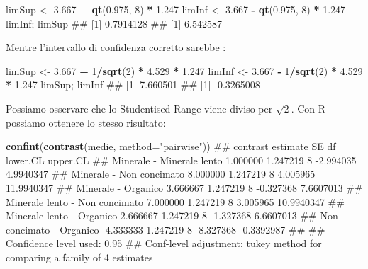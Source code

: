 \documentclass[a4paper,12pt,oneside]{book}
\newenvironment{Shaded}{\begin{snugshade}}{\end{snugshade}}
\newcommand{\KeywordTok}[1]{\textcolor[rgb]{0.13,0.29,0.53}{\textbf{#1}}}
\newcommand{\DataTypeTok}[1]{\textcolor[rgb]{0.13,0.29,0.53}{#1}}
\newcommand{\DecValTok}[1]{\textcolor[rgb]{0.00,0.00,0.81}{#1}}
\newcommand{\FloatTok}[1]{\textcolor[rgb]{0.00,0.00,0.81}{#1}}
\newcommand{\StringTok}[1]{\textcolor[rgb]{0.31,0.60,0.02}{#1}}
\newcommand{\OperatorTok}[1]{\textcolor[rgb]{0.81,0.36,0.00}{\textbf{#1}}}
\newcommand{\NormalTok}[1]{#1}
\theoremstyle{definition}
\theoremstyle{definition}
\theoremstyle{definition}
\theoremstyle{remark}
\begin{document}
\begin{Shaded}
\begin{Highlighting}[]
\NormalTok{limSup <-}\StringTok{ }\FloatTok{3.667} \OperatorTok{+}\StringTok{ }\KeywordTok{qt}\NormalTok{(}\FloatTok{0.975}\NormalTok{, }\DecValTok{8}\NormalTok{) }\OperatorTok{*}\StringTok{ }\FloatTok{1.247}
\NormalTok{limInf <-}\StringTok{ }\FloatTok{3.667} \OperatorTok{-}\StringTok{ }\KeywordTok{qt}\NormalTok{(}\FloatTok{0.975}\NormalTok{, }\DecValTok{8}\NormalTok{) }\OperatorTok{*}\StringTok{ }\FloatTok{1.247}
\NormalTok{limInf; limSup}
\NormalTok{## [1] 0.7914128}
\NormalTok{## [1] 6.542587}
\end{Highlighting}
\end{Shaded}

Mentre l'intervallo di confidenza corretto sarebbe :

\begin{Shaded}
\begin{Highlighting}[]
\NormalTok{limSup <-}\StringTok{ }\FloatTok{3.667} \OperatorTok{+}\StringTok{ }\DecValTok{1}\OperatorTok{/}\KeywordTok{sqrt}\NormalTok{(}\DecValTok{2}\NormalTok{) }\OperatorTok{*}\StringTok{ }\FloatTok{4.529} \OperatorTok{*}\StringTok{ }\FloatTok{1.247}
\NormalTok{limInf <-}\StringTok{ }\FloatTok{3.667} \OperatorTok{-}\StringTok{ }\DecValTok{1}\OperatorTok{/}\KeywordTok{sqrt}\NormalTok{(}\DecValTok{2}\NormalTok{) }\OperatorTok{*}\StringTok{ }\FloatTok{4.529} \OperatorTok{*}\StringTok{ }\FloatTok{1.247}
\NormalTok{limSup; limInf}
\NormalTok{## [1] 7.660501}
\NormalTok{## [1] -0.3265008}
\end{Highlighting}
\end{Shaded}

Possiamo osservare che lo Studentised Range viene diviso per
\(\sqrt{2}\). Con R possiamo ottenere lo stesso risultato:

\scriptsize

\begin{Shaded}
\begin{Highlighting}[]
\KeywordTok{confint}\NormalTok{(}\KeywordTok{contrast}\NormalTok{(medie, }\DataTypeTok{method=}\StringTok{"pairwise"}\NormalTok{))}
\NormalTok{##  contrast                        estimate       SE df  lower.CL   upper.CL}
\NormalTok{##  Minerale - Minerale lento       1.000000 1.247219  8 -2.994035  4.9940347}
\NormalTok{##  Minerale - Non concimato        8.000000 1.247219  8  4.005965 11.9940347}
\NormalTok{##  Minerale - Organico             3.666667 1.247219  8 -0.327368  7.6607013}
\NormalTok{##  Minerale lento - Non concimato  7.000000 1.247219  8  3.005965 10.9940347}
\NormalTok{##  Minerale lento - Organico       2.666667 1.247219  8 -1.327368  6.6607013}
\NormalTok{##  Non concimato - Organico       -4.333333 1.247219  8 -8.327368 -0.3392987}
\NormalTok{## }
\NormalTok{## Confidence level used: 0.95 }
\NormalTok{## Conf-level adjustment: tukey method for comparing a family of 4 estimates}
\end{Highlighting}
\end{Shaded}
\end{document}
